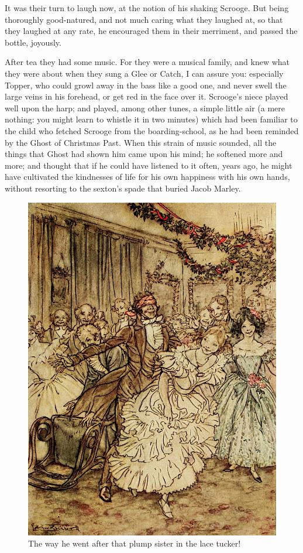 \documentclass[paper=5.5in:8.5in,BCOR=5mm,twoside,DIV=calc,12pt,usegeometry]{scrbook} %
\begin{document}
It was their turn to laugh now, at the notion of his shaking Scrooge. But being thoroughly good-natured, and not much caring what they laughed at, so that they laughed at any rate, he encouraged them in their merriment, and passed the bottle, joyously.

After tea they had some music. For they were a musical family, and knew what they were about when they sung a Glee or Catch, I can assure you: especially Topper, who could growl away in the bass like a good one, and never swell the large veins in his forehead, or get red in the face over it. Scrooge's niece played well upon the harp; and played, among other tunes, a simple little air (a mere nothing: you might learn to whistle it in two minutes) which had been familiar to the child who fetched Scrooge from the boarding-school, as he had been reminded by the Ghost of Christmas Past. When this strain of music sounded, all the things that Ghost had shown him came upon his mind; he softened more and more; and thought that if he could have listened to it often, years ago, he might have cultivated the kindnesses of life for his own happiness with his own hands, without resorting to the sexton's spade that buried Jacob Marley.

\begin{figure}[p]
\begin{minipage}[c]{\linewidth}
\includegraphics[width=\linewidth]{fredpartyimproved}
\caption*{The way he went after that plump sister in the lace tucker!}
\end{minipage}
\end{figure}
\end{document}
